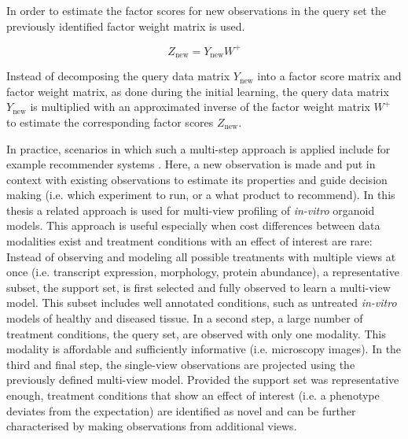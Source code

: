 \begin{flushleft}
In order to estimate the factor scores for new observations in the query set the previously identified factor weight matrix is used. 

\begin{equation}
    Z_{\text{new}} = Y_{\text{new}} W^+
\end{equation}

Instead of decomposing the query data matrix \(Y_{\text{new}}\) into a factor score matrix and factor weight matrix, as done during the initial learning, the query data matrix  \(Y_{\text{new}}\) is multiplied with an approximated inverse of the factor weight matrix \( W^+ \) to estimate the corresponding factor scores \( Z_{\text{new}} \).
\par

In practice, scenarios in which such a multi-step approach is applied include for example recommender systems \parencite{korenMatrixFactorizationTechniques2009}. Here, a new observation is made and put in context with existing observations to estimate its properties and guide decision making (i.e. which experiment to run, or a what product to recommend). In this thesis a related approach is used for multi-view profiling of \textit{in-vitro} organoid models. This approach is useful especially when cost differences between data modalities exist and treatment conditions with an effect of interest are rare: Instead of observing and modeling all possible treatments with multiple views at once (i.e. transcript expression, morphology, protein abundance), a representative subset, the support set, is first selected and fully observed to learn a multi-view model. This subset includes well annotated conditions, such as untreated \textit{in-vitro} models of healthy and diseased tissue. In a second step, a large number of treatment conditions, the query set, are observed with only one modality. This modality is affordable and sufficiently informative (i.e. microscopy images). In the third and final step, the single-view observations are projected using the previously defined multi-view model. Provided the support set was representative enough, treatment conditions that show an effect of interest (i.e. a phenotype deviates from the expectation) are identified as novel and can be further characterised by making observations from additional views.


\end{flushleft}
